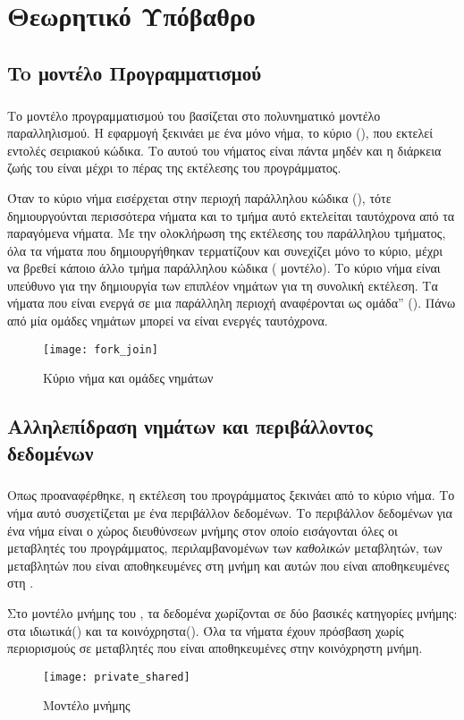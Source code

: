 \section{Θεωρητικό Υπόβαθρο}
\subsection{To μοντέλο Προγραμματισμού }
\subparagraph{}
Το μοντέλο προγραμματισμού του  βασίζεται στο πολυνηματικό μοντέλο παραλληλισμού.  Η εφαρμογή ξεκινάει με ένα μόνο νήμα, το κύριο (), που εκτελεί εντολές σειριακού κώδικα. Το \emph{} αυτού του νήματος είναι πάντα μηδέν και η διάρκεια ζωής του είναι μέχρι το πέρας της εκτέλεσης του προγράμματος\cite{pdplab}. 

Όταν το κύριο νήμα  εισέρχεται στην περιοχή παράλληλου κώδικα (), τότε δημιουργούνται περισσότερα νήματα και το τμήμα αυτό εκτελείται ταυτόχρονα από τα παραγόμενα νήματα. Με την ολοκλήρωση της εκτέλεσης του παράλληλου τμήματος, όλα τα νήματα που δημιουργήθηκαν τερματίζουν και συνεχίζει μόνο το κύριο, μέχρι να βρεθεί κάποιο άλλο τμήμα παράλληλου κώδικα ( μοντέλο)\cite{pdplab}. Το κύριο νήμα είναι υπεύθυνο για την δημιουργία των επιπλέον νημάτων για τη συνολική εκτέλεση. Τα νήματα που είναι ενεργά σε μια παράλληλη περιοχή αναφέρονται ως ομάδα” (\emph{}). Πάνω από μία ομάδες νημάτων μπορεί να είναι ενεργές ταυτόχρονα\cite{ompblaise}.

\begin{figure}[h]
\texttt{[image: fork\_join]}
\captionsetup{justification=centering, singlelinecheck=false}
\caption{Κύριο νήμα και ομάδες νημάτων}
\label{fig:fork_join}
\end{figure}

\subsection{Αλληλεπίδραση νημάτων και περιβάλλοντος δεδομένων}
\subparagraph{}
Οπως προαναφέρθηκε, η εκτέλεση του προγράμματος ξεκινάει από το κύριο νήμα. Το νήμα αυτό συσχετίζεται με ένα περιβάλλον δεδομένων. Το περιβάλλον δεδομένων για ένα νήμα είναι ο χώρος διευθύνσεων μνήμης στον οποίο εισάγονται όλες οι μεταβλητές του προγράμματος, περιλαμβανομένων των \emph{καθολικών} μεταβλητών, των μεταβλητών που είναι αποθηκευμένες στη μνήμη \emph{} και αυτών που είναι αποθηκευμένες στη \emph{}\cite{book2}. 

Στο μοντέλο μνήμης του , τα δεδομένα χωρίζονται σε δύο βασικές κατηγορίες μνήμης: στα ιδιωτικά(\emph{}) και τα κοινόχρηστα(\emph{}).  Όλα τα νήματα έχουν πρόσβαση χωρίς περιορισμούς σε μεταβλητές που είναι αποθηκευμένες στην κοινόχρηστη μνήμη\cite{thenextstep7}.
\ \\
\begin{center}
\begin{figure}[h]
\texttt{[image: private\_shared]}
\captionsetup{justification=centering, singlelinecheck=false}
\caption{Μοντέλο μνήμης }
\label{fig:private_shared}
\end{figure}
\end{center}
\ \\
